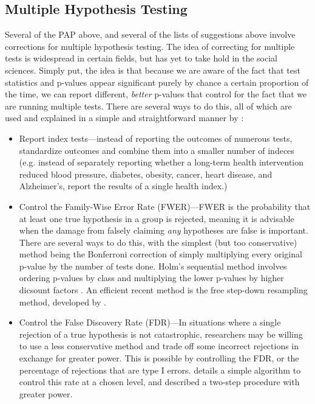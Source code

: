 \documentclass[12pt] {article}
\begin{document}
\subsection{Multiple Hypothesis Testing}
Several of the PAP above, and several of the lists of suggestions above involve corrections for multiple hypothesis testing. The idea of correcting for multiple tests is widespread in certain fields, but has yet to take hold in the social sciences. Simply put, the idea is that because we are aware of the fact that test statistics and p-values appear significant purely by chance a certain proportion of the time, we can report different, \textit{better} p-values that control for the fact that we are running multiple tests. There are several ways to do this, all of which are used and explained in a simple and straightforward manner by \cite{anderson_fwer}:
\begin{itemize}
\item
Report index tests---instead of reporting the outcomes of numerous tests, standardize outcomes and combine them into a smaller number of indeces (e.g. instead of separately reporting whether a long-term health intervention reduced blood pressure, diabetes, obesity, cancer, heart disease, and Alzheimer's, report the results of a single health index.)
\item
Control the Family-Wise Error Rate (FWER)---FWER is the probability that at least one true hypothesis in a group is rejected, meaning it is advisable when the damage from falsely claiming \textit{any} hypotheses are false is important. There are several ways to do this, with the simplest (but too conservative) method being the Bonferroni correction of simply multiplying every original p-value by the number of tests done. Holm's sequential method involves ordering p-values by class and multiplying the lower p-values by higher dicsount factors \citep{holm_multipletesting}. An efficient recent method is the free step-down resampling method, developed by \cite{westfall_young_multiple}.
  
\item
Control the False Discovery Rate (FDR)---In situations where a single rejection of a true hypothesis is not catastrophic, researchers may be willing to use a less conservative method and trade off some incorrect rejections in exchange for greater power. This is possible by controlling the FDR, or the percentage of rejections that are type I errors. \cite{benjamini1995controlling} details a simple algorithm to control this rate at a chosen level, and \cite{benjamini2006adapative} described a two-step procedure with greater power. 


\end{itemize}
\end{document}
